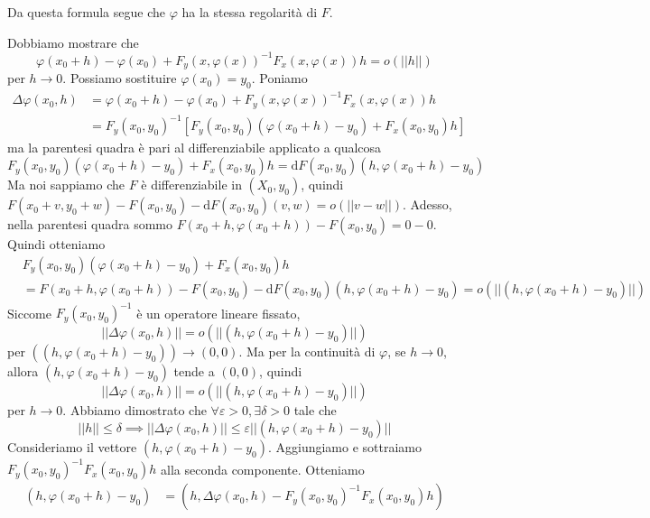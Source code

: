 \documentclass[a4paper]{article}
\begin{document}
\begin{radioactive}
Da questa formula segue che \(\varphi\) ha la stessa regolarità di \(F\).

\begin{snippetproof}{}
    Dobbiamo mostrare che
    \[
        \varphi(x_0 + h) - \varphi(x_0) + F_y(x, \varphi(x))^{-1} F_x(x, \varphi(x))h = o(||h||)
    \]
    per \(h \to 0\).
    Possiamo sostituire \(\varphi(x_0) = y_0\).
    Poniamo
    \begin{align*}
        \Delta \varphi(x_0, h) &= \varphi(x_0 + h) - \varphi(x_0) + F_y(x, \varphi(x))^{-1} F_x(x, \varphi(x))h \\
        &= F_y(x_0, y_0)^{-1} \left[
            F_y(x_0, y_0)(\varphi(x_0 + h) - y_0) + F_x(x_0, y_0)h
        \right]
    \end{align*}
    ma la parentesi quadra è pari al differenziabile applicato a qualcosa
    \[
        F_y(x_0, y_0)(\varphi(x_0 + h) - y_0) + F_x(x_0, y_0)h
        = \text{d}F(x_0, y_0)(h, \varphi(x_0 + h) - y_0)
    \]
    Ma noi sappiamo che \(F\) è differenziabile in \((X_0, y_0)\),
    quindi \(F(x_0 + v, y_0 + w) - F(x_0, y_0)  - \text{d}F(x_0, y_0)(v,w) = o(||v-w||)\).
    Adesso, nella parentesi quadra sommo \(F(x_0 + h, \varphi(x_0 + h)) - F(x_0, y_0) = 0 - 0\).
    Quindi otteniamo
    \begin{align*}
        &F_y(x_0, y_0)(\varphi(x_0 + h) - y_0) + F_x(x_0, y_0)h \\
        &= F(x_0 + h, \varphi(x_0 + h)) - F(x_0, y_0) - \text{d}F(x_0, y_0)(h, \varphi(x_0 + h) - y_0) = o(||(h, \varphi(x_0 + h) - y_0)||)
    \end{align*}
    Siccome \(F_y(x_0, y_0)^{-1}\) è un operatore lineare fissato,
    \[
        ||\Delta \varphi(x_0, h)|| = o(||(h, \varphi(x_0 + h) - y_0)||)
    \]
    per \(((h, \varphi(x_0 + h) - y_0)) \to (0,0)\).
    Ma per la continuità di \(\varphi\), se \(h \to 0\), allora \((h, \varphi(x_0 + h) - y_0)\)
    tende a \((0,0)\), quindi
    \[
    ||\Delta \varphi(x_0, h)|| = o(||(h, \varphi(x_0 + h) - y_0)||)
    \]
    per \(h \to 0\).
    Abbiamo dimostrato che \(\forall \varepsilon>0, \exists \delta > 0\) 
    tale che
    \[
        ||h|| \leq \delta \implies ||\Delta \varphi(x_0, h)|| \leq \varepsilon ||(h, \varphi(x_0 + h) - y_0)||
    \]
    Consideriamo il vettore \((h, \varphi(x_0 + h) - y_0)\). Aggiungiamo e sottraiamo \(F_y(x_0, y_0)^{-1}F_x(x_0, y_0)h\)
    alla seconda componente. Otteniamo
    \begin{align*}
        (h, \varphi(x_0 + h) - y_0) &= (h, \Delta \varphi(x_0, h) - F_y(x_0, y_0)^{-1}F_x(x_0,y_0)h) \\

\end{align*}
\end{snippetproof}
\end{radioactive}
\end{document}
